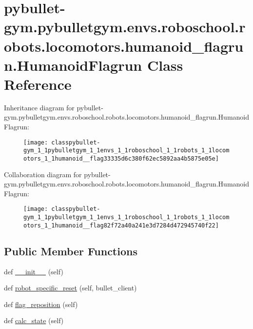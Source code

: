 \hypertarget{classpybullet-gym_1_1pybulletgym_1_1envs_1_1roboschool_1_1robots_1_1locomotors_1_1humanoid__flagrun_1_1_humanoid_flagrun}{}\section{pybullet-\/gym.pybulletgym.\+envs.\+roboschool.\+robots.\+locomotors.\+humanoid\+\_\+flagrun.\+Humanoid\+Flagrun Class Reference}
\label{classpybullet-gym_1_1pybulletgym_1_1envs_1_1roboschool_1_1robots_1_1locomotors_1_1humanoid__flagrun_1_1_humanoid_flagrun}


Inheritance diagram for pybullet-\/gym.pybulletgym.\+envs.\+roboschool.\+robots.\+locomotors.\+humanoid\+\_\+flagrun.\+Humanoid\+Flagrun\+:
\nopagebreak
\begin{figure}[H]
\begin{center}
\leavevmode
\texttt{[image: classpybullet-gym\_1\_1pybulletgym\_1\_1envs\_1\_1roboschool\_1\_1robots\_1\_1locomotors\_1\_1humanoid\_\_flag33335d6c380f62ec5892aa4b5875e05e]}
\end{center}
\end{figure}


Collaboration diagram for pybullet-\/gym.pybulletgym.\+envs.\+roboschool.\+robots.\+locomotors.\+humanoid\+\_\+flagrun.\+Humanoid\+Flagrun\+:
\nopagebreak
\begin{figure}[H]
\begin{center}
\leavevmode
\texttt{[image: classpybullet-gym\_1\_1pybulletgym\_1\_1envs\_1\_1roboschool\_1\_1robots\_1\_1locomotors\_1\_1humanoid\_\_flag82f72a40a241e3d7284d472945740f22]}
\end{center}
\end{figure}
\subsection*{Public Member Functions}
\begin{DoxyCompactItemize}
\item 
def \hyperlink{classpybullet-gym_1_1pybulletgym_1_1envs_1_1roboschool_1_1robots_1_1locomotors_1_1humanoid__flagrun_1_1_humanoid_flagrun_a3d9ef9ca9c667b6bc6091774cd69b167}{\+\_\+\+\_\+init\+\_\+\+\_\+} (self)
\item 
def \hyperlink{classpybullet-gym_1_1pybulletgym_1_1envs_1_1roboschool_1_1robots_1_1locomotors_1_1humanoid__flagrun_1_1_humanoid_flagrun_adedabb71fda1f0c30cc1c8f915652eb5}{robot\+\_\+specific\+\_\+reset} (self, bullet\+\_\+client)
\item 
def \hyperlink{classpybullet-gym_1_1pybulletgym_1_1envs_1_1roboschool_1_1robots_1_1locomotors_1_1humanoid__flagrun_1_1_humanoid_flagrun_a2ddfd75271571f0ff7a755c441fd577f}{flag\+\_\+reposition} (self)
\item 
def \hyperlink{classpybullet-gym_1_1pybulletgym_1_1envs_1_1roboschool_1_1robots_1_1locomotors_1_1humanoid__flagrun_1_1_humanoid_flagrun_a4c83f70f2e94214244863cdd59f4fc40}{calc\+\_\+state} (self)
\end{DoxyCompactItemize}
